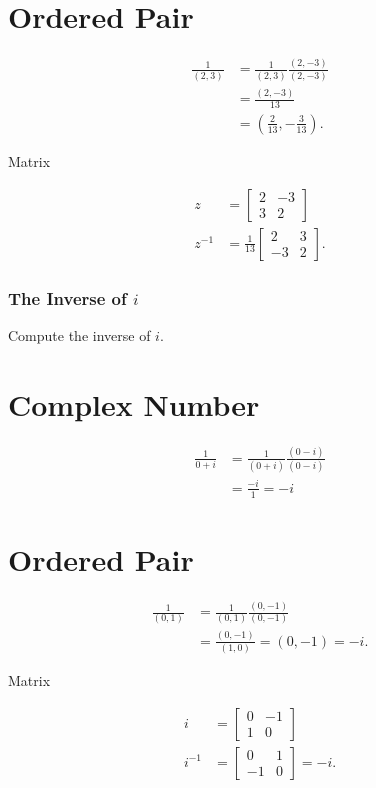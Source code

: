 \section{Ordered Pair}
$$
\begin{aligned}
\frac{1}{(2,3)} & =\frac{1}{(2,3)} \frac{(2,-3)}{(2,-3)} \\
& =\frac{(2,-3)}{13} \\
& =\left(\frac{2}{13},-\frac{3}{13}\right) .
\end{aligned}
$$

Matrix

$$
\begin{aligned}
z & =\left[\begin{array}{lc}
2 & -3 \\
3 & 2
\end{array}\right] \\
z^{-1} & =\frac{1}{13}\left[\begin{array}{cc}
2 & 3 \\
-3 & 2
\end{array}\right] .
\end{aligned}
$$

\subsubsection{The Inverse of $i$}
Compute the inverse of $i$.

\section{Complex Number}
$$
\begin{aligned}
\frac{1}{0+i} & =\frac{1}{(0+i)} \frac{(0-i)}{(0-i)} \\
& =\frac{-i}{1}=-i
\end{aligned}
$$

\section{Ordered Pair}
$$
\begin{aligned}
\frac{1}{(0,1)} & =\frac{1}{(0,1)} \frac{(0,-1)}{(0,-1)} \\
& =\frac{(0,-1)}{(1,0)}=(0,-1)=-i .
\end{aligned}
$$

Matrix

$$
\begin{aligned}
i & =\left[\begin{array}{cc}
0 & -1 \\
1 & 0
\end{array}\right] \\
i^{-1} & =\left[\begin{array}{cc}
0 & 1 \\
-1 & 0
\end{array}\right]=-i .
\end{aligned}
$$

